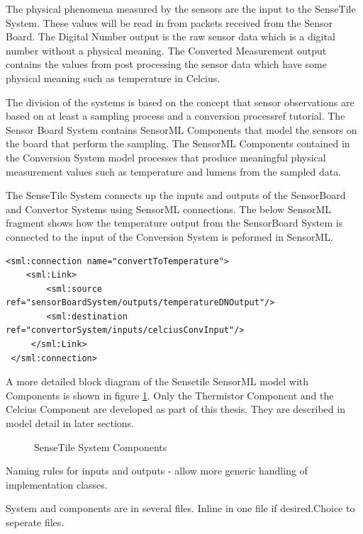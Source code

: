 \documentclass[]{final_report}
\begin{document}
The physical phenomena measured by the sensors are the input to the  SenseTile System. These values will be read in from packets received from the Sensor Board. The Digital Number output is the raw sensor data which is a digital number without a physical meaning. The Converted Measurement output contains the values from post processing the sensor data which have some physical meaning such as temperature in Celcius.

The division of the systems is based on the concept that sensor observations are based on at least a sampling process and a conversion process{ref tutorial}. The Sensor Board System contains SensorML Components that model the sensors on the board that perform the sampling. The SensorML Components contained in the Conversion System model processes that produce meaningful physical measurement values such as temperature and lumens from the sampled data.

The SenseTile System connects up the inputs and outputs of the SensorBoard and Convertor Systems using SensorML connections. The below SensorML fragment shows how the temperature output from the SensorBoard System is connected to the input of the Conversion System is peformed in SensorML.
\newpage
\begin{lstlisting}
<sml:connection name="convertToTemperature">
    <sml:Link>
        <sml:source ref="sensorBoardSystem/outputs/temperatureDNOutput"/>
        <sml:destination ref="convertorSystem/inputs/celciusConvInput"/>
     </sml:Link>
 </sml:connection>
\end{lstlisting}



A more detailed block diagram of the Sensetile SensorML model with Components is shown in figure \ref{fig:SensorML_SenseTile_System_comp}. Only the Thermistor Component and the Celcius Component are developed as part of this thesis. They are described in model detail in later sections.
\begin{figure}[h]
\caption{SenseTile System Components}\label{fig:SensorML_SenseTile_System_comp}
\end{figure}




Naming rules for inputs and outputs - allow more generic handling of implementation classes.

System and components are in several files. Inline in one file if desired.Choice to seperate files.
\end{document}
